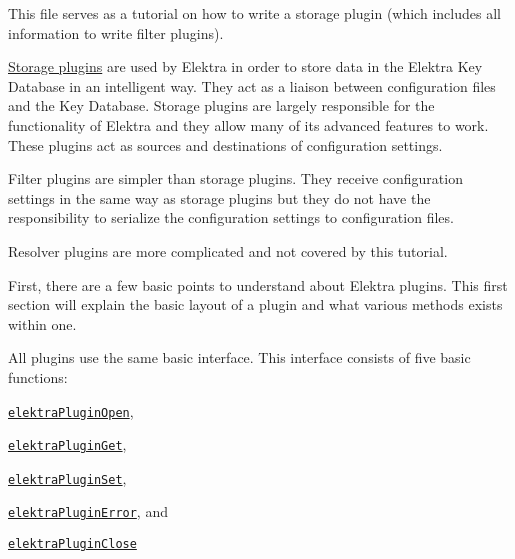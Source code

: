 This file serves as a tutorial on how to write a storage plugin (which includes all information to write filter plugins).


\begin{DoxyItemize}
\item \hyperlink{doc_tutorials_storage-plugins_md}{Storage plugins} are used by Elektra in order to store data in the Elektra Key Database in an intelligent way. They act as a liaison between configuration files and the Key Database. Storage plugins are largely responsible for the functionality of Elektra and they allow many of its advanced features to work. These plugins act as sources and destinations of configuration settings.
\item Filter plugins are simpler than storage plugins. They receive configuration settings in the same way as storage plugins but they do not have the responsibility to serialize the configuration settings to configuration files.
\item Resolver plugins are more complicated and not covered by this tutorial.
\end{DoxyItemize}

First, there are a few basic points to understand about Elektra plugins. This first section will explain the basic layout of a plugin and what various methods exists within one.

All plugins use the same basic interface. This interface consists of five basic functions\+:


\begin{DoxyItemize}
\item \href{https://doc.libelektra.org/api/latest/html/group__plugin.html#ga23c2eb3584e38a4d494eb8f91e5e3d8d}{\tt {\ttfamily elektra\+Plugin\+Open}},
\item \href{https://doc.libelektra.org/api/latest/html/group__plugin.html#gacb69f3441c6d84241b4362f958fbe313}{\tt {\ttfamily elektra\+Plugin\+Get}},
\item \href{https://doc.libelektra.org/api/latest/html/group__plugin.html#gae65781a1deb34efc79c8cb9d9174842c}{\tt {\ttfamily elektra\+Plugin\+Set}},
\item \href{https://doc.libelektra.org/api/latest/html/group__plugin.html#gad74b35f558ac7c3262f6069c5c47dc79}{\tt {\ttfamily elektra\+Plugin\+Error}}, and
\item \href{https://doc.libelektra.org/api/latest/html/group__plugin.html#ga1236aefe5b2baf8b7bf636ba5aa9ea29}{\tt {\ttfamily elektra\+Plugin\+Close}}
\end{DoxyItemize}

